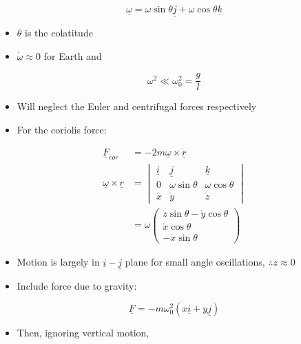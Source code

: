 \documentclass[a4paper,11pt,normalem]{article}
\begin{document}
\[
    \underline{\omega} = \omega\sin\theta\underline{j} + \omega\cos\theta\underline{k}
\]

\begin{itemize}
\item
  \(\theta\) is the colatitude
\item
  \(\underline{\dot{\omega}} \approx 0\) for Earth and
\end{itemize}

\[
    \omega^2 \ll \omega_0^2 = \frac{g}{l}
\]

\begin{itemize}
\item
  Will neglect the Euler and centrifugal forces respectively
\item
  For the coriolis force:
\end{itemize}

\[
    \begin{aligned}
    \underline{F}_{cor} &= -2m\underline{\omega} \times \underline{\dot{r}} \\
    \underline{\omega} \times \underline{\dot{r}} &= \begin{vmatrix} \underline{i} & \underline{j} & \underline{k} \\ 0 & \omega\sin\theta & \omega\cos\theta \\ \dot{x} & \dot{y} & \dot{z} \end{vmatrix} \\
    &= \omega\begin{pmatrix} \dot{z}\sin\theta - \dot{y}\cos\theta \\ \dot{x}\cos\theta \\ -\dot{x}\sin\theta \end{pmatrix}
    \end{aligned}
\]

\begin{itemize}
\item
  Motion is largely in \(\underline{i}-\underline{j}\) plane for small
  angle oscillations, \(\therefore \dot{z} \approx 0\)
\item
  Include force due to gravity:
\end{itemize}

\[
    \underline{F} = -m\omega_0^2 (x\underline{i} + y\underline{j})
\]

\begin{itemize}
\item
  Then, ignoring vertical motion,
\end{itemize}
\end{document}
